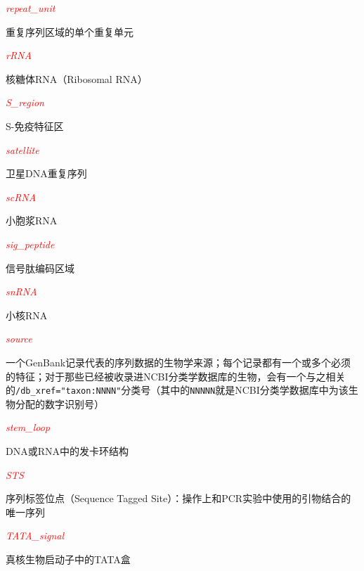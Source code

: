 \textcolor{red}{\textit{repeat\_unit}}
\begin{adjustwidth}{1cm}{}
重复序列区域的单个重复单元
\end{adjustwidth}

\textcolor{red}{\textit{rRNA}}
\begin{adjustwidth}{1cm}{}
核糖体RNA（Ribosomal RNA）
\end{adjustwidth}

\textcolor{red}{\textit{S\_region}}
\begin{adjustwidth}{1cm}{}
S-免疫特征区
\end{adjustwidth}

\textcolor{red}{\textit{satellite}}
\begin{adjustwidth}{1cm}{}
卫星DNA重复序列
\end{adjustwidth}

\textcolor{red}{\textit{scRNA}}
\begin{adjustwidth}{1cm}{}
小胞浆RNA
\end{adjustwidth}

\textcolor{red}{\textit{sig\_peptide}}
\begin{adjustwidth}{1cm}{}
信号肽编码区域
\end{adjustwidth}

\textcolor{red}{\textit{snRNA}}
\begin{adjustwidth}{1cm}{}
小核RNA
\end{adjustwidth}

\textcolor{red}{\textit{source}}
\begin{adjustwidth}{1cm}{}
一个GenBank记录代表的序列数据的生物学来源；每个记录都有一个或多个必须的特征；对于那些已经被收录进NCBI分类学数据库的生物，会有一个与之相关的\verb|/db_xref="taxon:NNNN"|分类号（其中的\verb|NNNNN|就是NCBI分类学数据库中为该生物分配的数字识别号）
\end{adjustwidth}

\textcolor{red}{\textit{stem\_loop}}
\begin{adjustwidth}{1cm}{}
DNA或RNA中的发卡环结构
\end{adjustwidth}

\textcolor{red}{\textit{STS}}
\begin{adjustwidth}{1cm}{}
序列标签位点（Sequence Tagged Site）：操作上和PCR实验中使用的引物结合的唯一序列
\end{adjustwidth}

\textcolor{red}{\textit{TATA\_signal}}
\begin{adjustwidth}{1cm}{}
真核生物启动子中的TATA盒
\end{adjustwidth}

